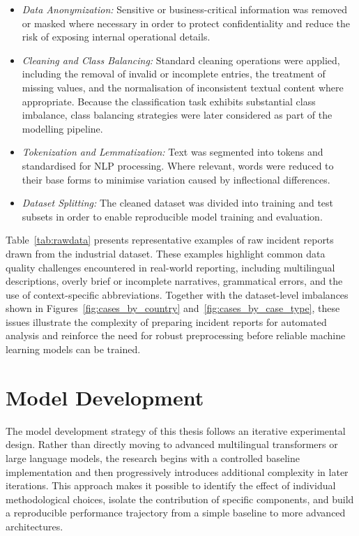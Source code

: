 \documentclass[11pt, titlepage, bibliography=totoc]{scrreprt}
\begin{document}
\begin{itemize}
    \item \textit{Data Anonymization:} Sensitive or business-critical information was removed or masked where necessary in order to protect confidentiality and reduce the risk of exposing internal operational details.
    
    \item \textit{Cleaning and Class Balancing:} Standard cleaning operations were applied, including the removal of invalid or incomplete entries, the treatment of missing values, and the normalisation of inconsistent textual content where appropriate. Because the classification task exhibits substantial class imbalance, class balancing strategies were later considered as part of the modelling pipeline.
    
    \item \textit{Tokenization and Lemmatization:} Text was segmented into tokens and standardised for NLP processing. Where relevant, words were reduced to their base forms to minimise variation caused by inflectional differences.
    
    \item \textit{Dataset Splitting:} The cleaned dataset was divided into training and test subsets in order to enable reproducible model training and evaluation.
\end{itemize}

\newpage

Table~\ref{tab:rawdata} presents representative examples of raw incident reports drawn from the industrial dataset. These examples highlight common data quality challenges encountered in real-world reporting, including multilingual descriptions, overly brief or incomplete narratives, grammatical errors, and the use of context-specific abbreviations. Together with the dataset-level imbalances shown in Figures~\ref{fig:cases_by_country} and~\ref{fig:cases_by_case_type}, these issues illustrate the complexity of preparing incident reports for automated analysis and reinforce the need for robust preprocessing before reliable machine learning models can be trained.

\section{Model Development}

The model development strategy of this thesis follows an iterative experimental design. Rather than directly moving to advanced multilingual transformers or large language models, the research begins with a controlled baseline implementation and then progressively introduces additional complexity in later iterations. This approach makes it possible to identify the effect of individual methodological choices, isolate the contribution of specific components, and build a reproducible performance trajectory from a simple baseline to more advanced architectures.
\end{document}
